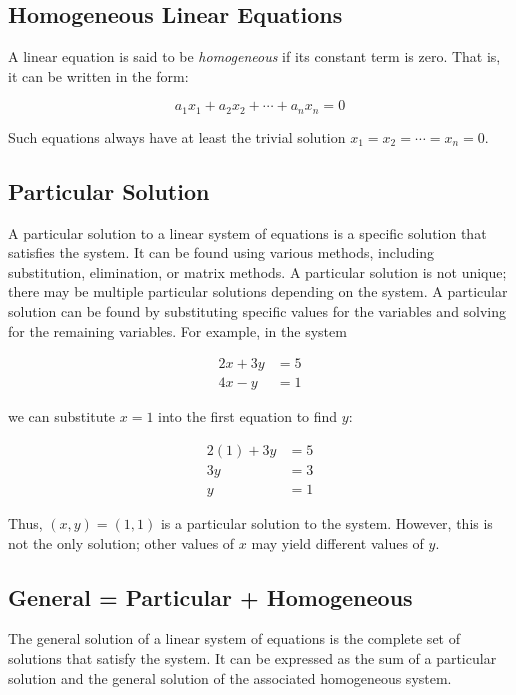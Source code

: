 \subsection{Homogeneous Linear Equations}

A linear equation is said to be \emph{homogeneous} if its constant term is zero. That is, it 
can be written in the form:

\[
	a_1 x_1 + a_2 x_2 + \cdots + a_n x_n = 0
\]

Such equations always have at least the trivial solution \(x_1 = x_2 = \cdots = x_n = 0\).

\subsection{Particular Solution}

A particular solution to a linear system of equations is a specific solution that satisfies the system. 
It can be found using various methods, including substitution, elimination, or matrix methods. A 
particular solution is not unique; there may be multiple particular solutions depending on the system.
A particular solution can be found by substituting specific values for the variables and solving for the 
remaining variables. For example, in the system

\begin{align*}
	2x + 3y & = 5 \\
	4x - y  & = 1
\end{align*}

we can substitute \(x = 1\) into the first equation to find \(y\):

\begin{align*}
	2(1) + 3y & = 5 \\
	3y        & = 3 \\
	y         & = 1
\end{align*}

Thus, \((x, y) = (1, 1)\) is a particular solution to the system. However, this is not the only solution; 
other values of \(x\) may yield different values of \(y\).

\subsection{General = Particular + Homogeneous}

The general solution of a linear system of equations is the complete set of solutions that satisfy the 
system. It can be expressed as the sum of a particular solution and the general solution of the associated 
homogeneous system.

